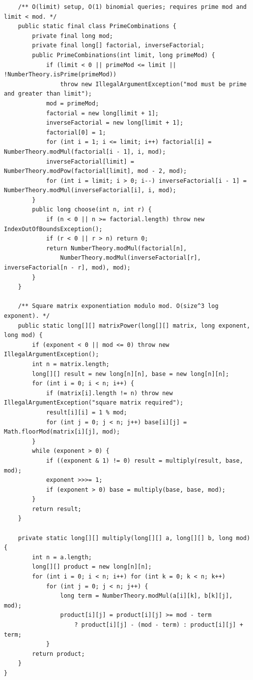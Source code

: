 \documentclass[10pt,letterpaper]{article}
\begin{document}
\begin{lstlisting}
    /** O(limit) setup, O(1) binomial queries; requires prime mod and limit < mod. */
    public static final class PrimeCombinations {
        private final long mod;
        private final long[] factorial, inverseFactorial;
        public PrimeCombinations(int limit, long primeMod) {
            if (limit < 0 || primeMod <= limit || !NumberTheory.isPrime(primeMod))
                throw new IllegalArgumentException("mod must be prime and greater than limit");
            mod = primeMod;
            factorial = new long[limit + 1];
            inverseFactorial = new long[limit + 1];
            factorial[0] = 1;
            for (int i = 1; i <= limit; i++) factorial[i] = NumberTheory.modMul(factorial[i - 1], i, mod);
            inverseFactorial[limit] = NumberTheory.modPow(factorial[limit], mod - 2, mod);
            for (int i = limit; i > 0; i--) inverseFactorial[i - 1] = NumberTheory.modMul(inverseFactorial[i], i, mod);
        }
        public long choose(int n, int r) {
            if (n < 0 || n >= factorial.length) throw new IndexOutOfBoundsException();
            if (r < 0 || r > n) return 0;
            return NumberTheory.modMul(factorial[n],
                NumberTheory.modMul(inverseFactorial[r], inverseFactorial[n - r], mod), mod);
        }
    }

    /** Square matrix exponentiation modulo mod. O(size^3 log exponent). */
    public static long[][] matrixPower(long[][] matrix, long exponent, long mod) {
        if (exponent < 0 || mod <= 0) throw new IllegalArgumentException();
        int n = matrix.length;
        long[][] result = new long[n][n], base = new long[n][n];
        for (int i = 0; i < n; i++) {
            if (matrix[i].length != n) throw new IllegalArgumentException("square matrix required");
            result[i][i] = 1 % mod;
            for (int j = 0; j < n; j++) base[i][j] = Math.floorMod(matrix[i][j], mod);
        }
        while (exponent > 0) {
            if ((exponent & 1) != 0) result = multiply(result, base, mod);
            exponent >>>= 1;
            if (exponent > 0) base = multiply(base, base, mod);
        }
        return result;
    }

    private static long[][] multiply(long[][] a, long[][] b, long mod) {
        int n = a.length;
        long[][] product = new long[n][n];
        for (int i = 0; i < n; i++) for (int k = 0; k < n; k++)
            for (int j = 0; j < n; j++) {
                long term = NumberTheory.modMul(a[i][k], b[k][j], mod);
                product[i][j] = product[i][j] >= mod - term
                    ? product[i][j] - (mod - term) : product[i][j] + term;
            }
        return product;
    }
}
\end{lstlisting}
\end{document}
